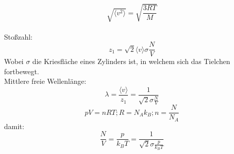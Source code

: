 \documentclass[a4paper]{article}
\begin{document}
\begin{equation*}
    \sqrt{\langle v^2 \rangle} = \sqrt{\frac{3RT}{M}}
\end{equation*}
\\
Stoßzahl:
\begin{equation*}
    z_1=\sqrt{2}\langle v\rangle \sigma \frac{N}{V}
\end{equation*}
Wobei $\sigma$ die Kriesfläche eines Zylinders ist, in welchem sich das Tielchen fortbewegt.\\
Mittlere freie Wellenlänge: 
\begin{equation*}
    \lambda = \frac{\langle v \rangle}{z_1}=\frac{1}{\sqrt{2}\sigma\frac{N}{V}}
\end{equation*}
\begin{equation*}
    pV = nRT; R = N_Ak_B; n=\frac{N}{N_A}
\end{equation*}
damit:
\begin{equation*}
    \frac{N}{V}=\frac{p}{k_BT}=\frac{1}{\sqrt{2}\sigma\frac{p}{k_BT}}
\end{equation*}
\end{document}
